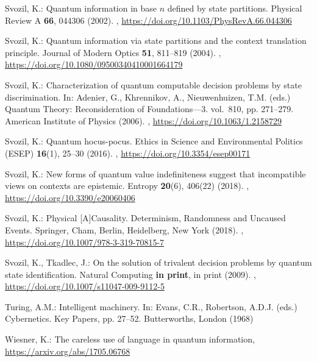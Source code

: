 \documentclass[runningheads]{llncs}
\begin{document}
\begin{thebibliography}{10}
Svozil, K.: Quantum information in base $n$ defined by state partitions.
  Physical Review A  \textbf{66},  044306 (2002).
  ,
  \url{https://doi.org/10.1103/PhysRevA.66.044306}

Svozil, K.: Quantum information via state partitions and the context
  translation principle. Journal of Modern Optics  \textbf{51},  811--819
  (2004). ,
  \url{https://doi.org/10.1080/09500340410001664179}

Svozil, K.: Characterization of quantum computable decision problems by state
  discrimination. In: Adenier, G., Khrennikov, A., Nieuwenhuizen, T.M. (eds.)
  Quantum Theory: Reconsideration of Foundations---3. vol.~810, pp. 271--279.
  American Institute of Physics (2006). ,
  \url{https://doi.org/10.1063/1.2158729}

Svozil, K.: Quantum hocus-pocus. Ethics in Science and Environmental Politics
  (ESEP)  \textbf{16}(1),  25--30 (2016). ,
  \url{https://doi.org/10.3354/esep00171}

Svozil, K.: New forms of quantum value indefiniteness suggest that incompatible
  views on contexts are epistemic. Entropy  \textbf{20}(6),  406(22) (2018).
  , \url{https://doi.org/10.3390/e20060406}

Svozil, K.: Physical [A]Causality. {D}eterminism, Randomness and Uncaused
  Events. Springer, Cham, Berlin, Heidelberg, New York (2018).
  ,
  \url{https://doi.org/10.1007/978-3-319-70815-7}

Svozil, K., Tkadlec, J.: On the solution of trivalent decision problems by
  quantum state identification. Natural Computing  \textbf{in print},  in print
  (2009). ,
  \url{https://doi.org/10.1007/s11047-009-9112-5}

Turing, A.M.: Intelligent machinery. In: Evans, C.R., Robertson, A.D.J. (eds.)
  {C}ybernetics. {K}ey Papers, pp. 27--52. Butterworths, London (1968)

Wiesner, K.: The careless use of language in quantum information,
  \url{https://arxiv.org/abs/1705.06768}

\end{thebibliography}
\end{document}
